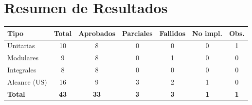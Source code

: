 \section{Resumen de Resultados}

\renewcommand{\arraystretch}{1.65}
\begin{tabularx}{\linewidth}{|X|c|c|c|c|c|c|}
\hline
\rowcolor{grisheader}
\textbf{Tipo} & \textbf{Total} & \textbf{Aprobados} & \textbf{Parciales} & \textbf{Fallidos} & \textbf{No impl.} & \textbf{Obs.} \\
\hline
Unitarias        & 10 & 8 & 0 & 0 & 0 & 1 \\
\hline
Modulares        & 9  & 8 & 0 & 1 & 0 & 0 \\
\hline
Integrales       & 8  & 8 & 0 & 0 & 0 & 0 \\
\hline
Alcance (US)     & 16 & 9 & 3 & 2 & 1 & 0 \\
\hline
\rowcolor{rowgray}
\textbf{Total}   & \textbf{43} & \textbf{33} & \textbf{3} & \textbf{3} & \textbf{1} & \textbf{1} \\
\hline
\end{tabularx}
